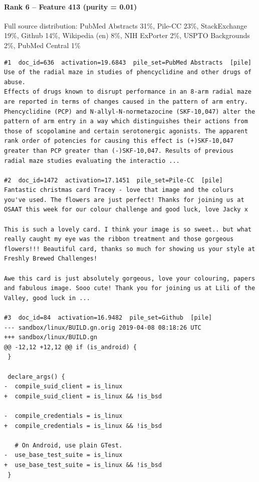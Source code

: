 \paragraph*{Rank 6 -- Feature 413 (purity = 0.01)}

Full source distribution: PubMed Abstracts 31\%, Pile-CC 23\%, StackExchange 19\%, Github 14\%, Wikipedia (en) 8\%, NIH ExPorter 2\%, USPTO Backgrounds 2\%, PubMed Central 1\%

\begin{verbatim}
#1  doc_id=636  activation=19.6843  pile_set=PubMed Abstracts  [pile]
Use of the radial maze in studies of phencyclidine and other drugs of abuse.
Effects of drugs known to disrupt performance in an 8-arm radial maze are reported in terms of changes caused in the pattern of arm entry. Phencyclidine (PCP) and N-allyl-N-normetazocine (SKF-10,047) alter the pattern of arm entry in a way which distinguishes their actions from those of scopolamine and certain serotonergic agonists. The apparent rank order of potencies for causing this effect is (+)SKF-10,047 greater than PCP greater than (-)SKF-10,047. Results of previous radial maze studies evaluating the interactio ...

#2  doc_id=1472  activation=17.1451  pile_set=Pile-CC  [pile]
Fantastic christmas card Tracey - love that image and the colurs you've used. The flowers are just perfect! Thanks for joining us at OSAAT this week for our colour challenge and good luck, love Jacky x

This is such a lovely card. I think your image is so sweet.. but what really caught my eye was the ribbon treatment and those gorgeous flowers!!! Beautiful card, thanks so much for showing us your style at Freshly Brewed Challenges!

Awe this card is just absolutely gorgeous, love your colouring, papers and fabulous image. Sooo cute! Thank you for joining us at Lili of the Valley, good luck in ...

#3  doc_id=84  activation=16.9482  pile_set=Github  [pile]
--- sandbox/linux/BUILD.gn.orig	2019-04-08 08:18:26 UTC
+++ sandbox/linux/BUILD.gn
@@ -12,12 +12,12 @@ if (is_android) {
 }
 
 declare_args() {
-  compile_suid_client = is_linux
+  compile_suid_client = is_linux && !is_bsd
 
-  compile_credentials = is_linux
+  compile_credentials = is_linux && !is_bsd
 
   # On Android, use plain GTest.
-  use_base_test_suite = is_linux
+  use_base_test_suite = is_linux && !is_bsd
 }
 

\end{verbatim}
